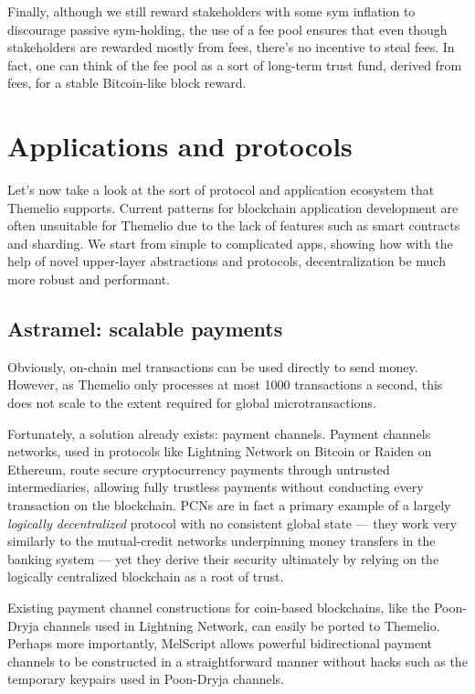 \documentclass[headinclude,12pt]{scrbook}
\begin{document}
Finally, although we still reward stakeholders with some sym inflation to discourage passive sym-holding, the use of a fee pool ensures that even though stakeholders are rewarded mostly from fees, there's no incentive to steal fees. In fact, one can think of the fee pool as a sort of long-term trust fund, derived from fees, for a stable Bitcoin-like block reward.

\chapter{Applications and protocols}

Let's now take a look at the sort of protocol and application ecosystem that Themelio supports. Current patterns for blockchain application development are often unsuitable for Themelio due to the lack of features such as smart contracts and sharding. We start from simple to complicated apps, showing how with the help of novel upper-layer abstractions and protocols, decentralization be much more robust and performant.

\section{Astramel: scalable payments}

Obviously, on-chain mel transactions can be used directly to send money. However, as Themelio only processes at most 1000 transactions a second, this does not scale to the extent required for global microtransactions.

Fortunately, a solution already exists: payment channels. Payment channels networks, used in protocols like Lightning Network on Bitcoin or Raiden on Ethereum, route secure cryptocurrency payments through untrusted intermediaries, allowing fully trustless payments without conducting every transaction on the blockchain. PCNs are in fact a primary example of a largely \emph{logically decentralized} protocol with no consistent global state --- they work very similarly to the mutual-credit networks underpinning money transfers in the banking system --- yet they derive their security ultimately by relying on the logically centralized blockchain as a root of trust.

Existing payment channel constructions for coin-based blockchains, like the Poon-Dryja channels used in Lightning Network, can easily be ported to Themelio. Perhaps more importantly, MelScript allows powerful bidirectional payment channels to be constructed in a straightforward manner without hacks such as the temporary keypairs used in Poon-Dryja channels.
\end{document}
